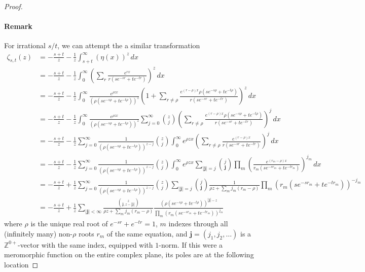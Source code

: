 \documentclass[]{article}
\begin{document}
\begin{proof}
\paragraph{Remark}

For irrational $s / t$, we can attempt the a similar transformation
\begin{align*}
	\zeta_{s,t}(z) &= -\frac{s+t}{z} - \frac{1}{z}\int_{s+t}^{\infty}\left(\eta(x)\right)^z\,dx\\
	&= -\frac{s+t}{z} - \frac{1}{z}\int_{0}^{\infty}\left( \sum_r \frac{e^{rx}}{r(s e^{-sr} + t e^{-tr})}\right)^z\,dx\\
	&= -\frac{s+t}{z} - \frac{1}{z}\int_{0}^{\infty} \frac{e^{\rho z x }}{\left(\rho(s e^{-s\rho} + t e^{-t\rho})\right)^z} \left(1 +  \sum_{r\ne\rho} \frac{e^{(r-\rho)x}\rho(s e^{-s\rho} + t e^{-t\rho})}{r(s e^{-sr} + t e^{-tr})}\right)^z\,dx \\
	&= -\frac{s+t}{z} - \frac{1}{z}\int_{0}^{\infty} \frac{e^{\rho z x }}{\left(\rho(s e^{-s\rho} + t e^{-t\rho})\right)^z} \sum_{j=0}^{\infty}{z\choose j}\left(\sum_{r\ne\rho} \frac{e^{(r-\rho)x}\rho(s e^{-s\rho} + t e^{-t\rho})}{r(s e^{-sr} + t e^{-tr})}\right)^j\,dx\\
	&= -\frac{s+t}{z} - \frac{1}{z}\sum_{j=0}^{\infty}\frac{1}{\left(\rho(s e^{-s\rho} + t e^{-t\rho})\right)^{z-j}} {z\choose j}\int_{0}^{\infty}  e^{\rho z x } \left(\sum_{r\ne\rho} \frac{e^{(r-\rho)x}}{r(s e^{-sr} + t e^{-tr})}\right)^j\,dx \\
	&= -\frac{s+t}{z} - \frac{1}{z}\sum_{j=0}^{\infty}\frac{1}{\left(\rho(s e^{-s\rho} + t e^{-t\rho})\right)^{z-j}} {z\choose j}\int_{0}^{\infty}  e^{\rho z x }  \sum_{|\mathbf{j}| = j}{j\choose \mathbf{j}}  \prod_m \left(\frac{e^{(r_m-\rho)x}}{r_m(s e^{-sr_m} + t e^{-tr_m})}\right)^{j_m}\,dx \\
	&= -\frac{s+t}{z} + \frac{1}{z}\sum_{j=0}^{\infty}\frac{1}{\left(\rho(s e^{-s\rho} + t e^{-t\rho})\right)^{z-j}} {z\choose j}   \sum_{|\mathbf{j}| = j}{j\choose \mathbf{j}}  \frac{1}{\rho z + \sum_m j_m (r_m-\rho)} \prod_m \left(r_m(s e^{-sr_m} + t e^{-tr_m})\right)^{-j_m}\\
	&= -\frac{s+t}{z} + \frac{1}{z}\sum_{|\mathbf{j}|<\infty}  \frac{{z\choose \mathbf{j}, z-|\mathbf{j}|}}{\rho z + \sum_m j_m (r_m-\rho)}  \frac{\left(\rho(s e^{-s\rho} + t e^{-t\rho})\right)^{|\mathbf{j}|-z}}{\prod_m\left(r_m(s e^{-sr_m} + t e^{-tr_m})\right)^{j_m}}
\end{align*}
where $\rho$ is the unique real root of $e^{-sr} + e^{-tr} = 1$, $m$ indexes through all (infinitely many) non-$\rho$ roots $r_m$ of the same equation, and $\mathbf{j} = (j_1,j_2,\dots)$ is a $\mathbb{Z}^{0+}$-vector with the same index, equipped with $1$-norm. If this were a meromorphic function on the entire complex plane, its poles are at the following location

\end{proof}
\end{document}
